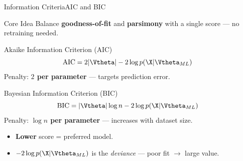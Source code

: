 \begin{frame}{Information Criteria}{AIC and BIC}
  \begin{block}{Core Idea}
    Balance \textbf{goodness-of-fit} and \textbf{parsimony} with a single score — no retraining needed.
  \end{block}

  \begin{block}{Akaike Information Criterion (AIC)}
    \[
      \mathrm{AIC} = 2|\Vtheta| - 2\log p(\X|\Vtheta_{ML})
    \]
    Penalty: \textbf{$2$ per parameter} — targets prediction error.
  \end{block}

  \begin{block}{Bayesian Information Criterion (BIC)}
    \[
      \mathrm{BIC} = |\Vtheta|\log n - 2\log p(\X|\Vtheta_{ML})
    \]
    Penalty: \textbf{$\log n$ per parameter} — increases with dataset size.
  \end{block}

  \begin{itemize}
    \item \textbf{Lower} score = preferred model.
    \item $-2\log p(\X|\Vtheta_{ML})$ is the \textit{deviance} — poor fit $\to$ large value.
  \end{itemize}
\end{frame}

